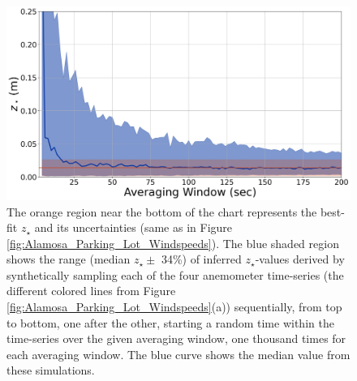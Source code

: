 \documentclass[linenumbers]{aastex631}
\begin{document}
\begin{figure}
    \centering
    \includegraphics[width=\textwidth]{figures and data/synthetic_terrestrial_wind_profile.jpg}
    \caption{The orange region near the bottom of the chart represents the best-fit $z_\star$ and its uncertainties (same as in Figure \ref{fig:Alamosa_Parking_Lot_Windspeeds}). The blue shaded region shows the range (median $z_\star \pm$ 34\%) of inferred $z_\star$-values derived by synthetically sampling each of the four anemometer time-series (the different colored lines from Figure \ref{fig:Alamosa_Parking_Lot_Windspeeds}(a)) sequentially, from top to bottom, one after the other, starting a random time within the time-series over the given averaging window, one thousand times for each averaging window. The blue curve shows the median value from these simulations.}
    \label{fig:synthetic_terrestrial_wind_profile}
\end{figure}
\end{document}
